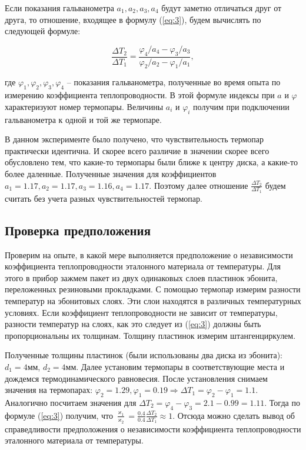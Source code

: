 \documentclass[a4paper,11.5pt]{article} %
\begin{document}
Если показания гальванометра $a_1, a_2, a_3, a_4$ будут заметно отличаться друг от друга, то отношение, входящее в формулу (\ref{eq:3}), будем вычислять по следующей формуле:

\begin{equation}
	\frac{\Delta T_2}{\Delta T_1} = \frac{\varphi_4/a_4 - \varphi_3/a_3}{\varphi_2/a_2 - \varphi_1/a_1},
	\label{eq:6}
\end{equation}

где $\varphi_1, \varphi_2, \varphi_3, \varphi_4$ -- показания гальванометра, полученные во время опыта по измерению коэффициента теплопроводности. В этой формуле индексы при $a$ и $\varphi$ характеризуют номер термопары. Величины $a_i$ и $\varphi_i$ получим при подключении гальванометра к одной и той же термопаре.

В данном эксперименте было получено, что чувствительность термопар практически идентична. И скорее всего различие в значении скорее всего обусловлено тем, что какие-то термопары были ближе к центру диска, а какие-то более даленные. Полученные значения для коэффициентов $a_1 = 1.17, a_2 = 1.17, a_3 = 1.16, a_4 = 1.17$. Поэтому далее отношение $\frac{\Delta T_2}{\Delta T_1}$ будем считать без учета разных чувствительностей термопар. 

\subsection{Проверка предположения}
Проверим на опыте, в какой мере выполняется предположение о независимости коэффициента теплопроводности эталонного материала от температуры. Для этого в прибор зажмем пакет из двух одинаковых слоев пластинок эбонита, переложенных резиновыми прокладками. С помощью термопар измерим разности температур на эбонитовых слоях. Эти слои находятся в различных температурных условиях. Если коэффициент теплопроводности не зависит от температуры, разности температур на слоях, как это следует из (\ref{eq:3}) должны быть пропорциональны их толщинам.  Толщину пластинок измерим штангенциркулем. 

Полученные толщины пластинок (были использованы два диска из эбонита): $d_1 = 4 \textbf{мм}$, $d_2 = 4 \textbf{мм}$. Далее установим термопары в соответствующие места и дождемся термодинамического равновесия. После установления снимаем значения на термопарах: $\varphi_2 = 1.29, \varphi_1 = 0.19 \Rightarrow \Delta T_1 = \varphi_2 - \varphi_1 = 1.1$. Аналогично посчитаем значения для $\Delta T_2 = \varphi_4 - \varphi_3 = 2.1 - 0.99 = 1.11$. Тогда по формуле (\ref{eq:3}) получим, что $\frac{\varkappa_1}{\varkappa_2} = \frac{0.4}{0.4}\frac{\Delta T_2}{\Delta T_1} \approx 1.$ Отсюда можно сделать вывод об справедливости предположения о независимости коэффициента теплопроводности эталонного материала от температуры.  
\end{document}

